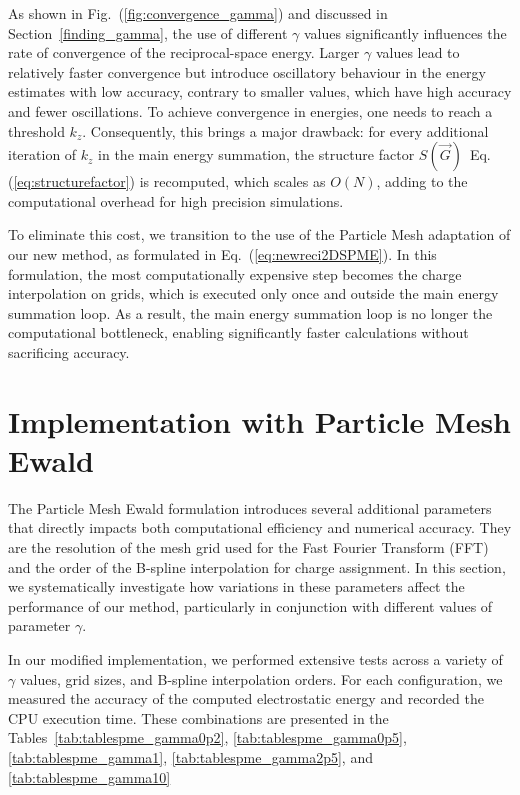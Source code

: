 As shown in Fig.~(\ref{fig:convergence_gamma}) and discussed in Section~\ref{finding_gamma}, the use of different $\gamma$ values significantly influences the rate of convergence of the reciprocal-space energy. Larger $\gamma$ values lead to relatively faster convergence but introduce oscillatory behaviour in the energy estimates with low accuracy, contrary to smaller values, which have high accuracy and fewer oscillations. To achieve convergence in energies, one needs to reach a threshold $k_z$. Consequently, this brings a major drawback: for every additional iteration of $k_z$ in the main energy summation, the structure factor $S(\vec G)$~Eq.(\ref{eq:structurefactor}) is recomputed, which scales as $O(N)$, adding to the computational overhead for high precision simulations. 

To eliminate this cost, we transition to the use of the Particle Mesh adaptation of our new method, as formulated in Eq.~(\ref{eq:newreci2DSPME}). In this formulation, the most computationally expensive step becomes the charge interpolation on grids, which is executed only once and outside the main energy summation loop. As a result, the main energy summation loop is no longer the computational bottleneck, enabling significantly faster calculations without sacrificing accuracy.

\section{Implementation with Particle Mesh Ewald}
The Particle Mesh Ewald formulation introduces several additional parameters that directly impacts both computational efficiency and numerical accuracy. They are the resolution of the mesh grid used for the Fast Fourier Transform (FFT) and the order of the B-spline interpolation for charge assignment. In this section, we systematically investigate how variations in these parameters affect the performance of our method, particularly in conjunction with different values of parameter $\gamma$.

In our modified implementation, we performed extensive tests across a variety of $\gamma$ values, grid sizes, and B-spline interpolation orders. For each configuration, we measured the accuracy of the computed electrostatic energy and recorded the CPU execution time. These combinations are presented in the Tables~\ref{tab:tablespme_gamma0p2}, \ref{tab:tablespme_gamma0p5}, \ref{tab:tablespme_gamma1}, \ref{tab:tablespme_gamma2p5}, and \ref{tab:tablespme_gamma10}

